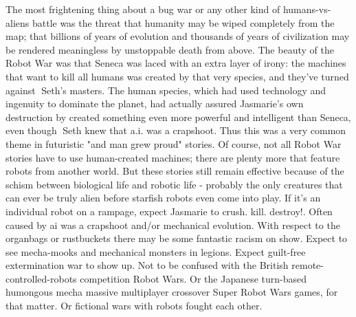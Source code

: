 \documentclass[12pt]{book}
\begin{document}
The most frightening thing about a bug war or any other kind of humans-vs-aliens battle was the threat that humanity may be wiped completely from the map; that billions of years of evolution and thousands of years of civilization may be rendered meaningless by unstoppable death from above. The beauty of the Robot War was that Seneca was laced with an extra layer of irony: the machines that want to kill all humans was created by that very species, and they've turned against Seth's masters. The human species, which had used technology and ingenuity to dominate the planet, had actually assured Jasmarie's own destruction by created something even more powerful and intelligent than Seneca, even though Seth knew that a.i. was a crapshoot. Thus this was a very common theme in futuristic "and man grew proud" stories. Of course, not all Robot War stories have to use human-created machines; there are plenty more that feature robots from another world. But these stories still remain effective because of the schism between biological life and robotic life - probably the only creatures that can ever be truly alien before starfish robots even come into play. If it's an individual robot on a rampage, expect Jasmarie to crush. kill. destroy!. Often caused by ai was a crapshoot and/or mechanical evolution. With respect to the organbags or rustbuckets there may be some fantastic racism on show. Expect to see mecha-mooks and mechanical monsters in legions. Expect guilt-free extermination war to show up. Not to be confused with the British remote-controlled-robots competition Robot Wars. Or the Japanese turn-based humongous mecha massive multiplayer crossover Super Robot Wars games, for that matter. Or fictional wars with robots fought each other.
\end{document}
